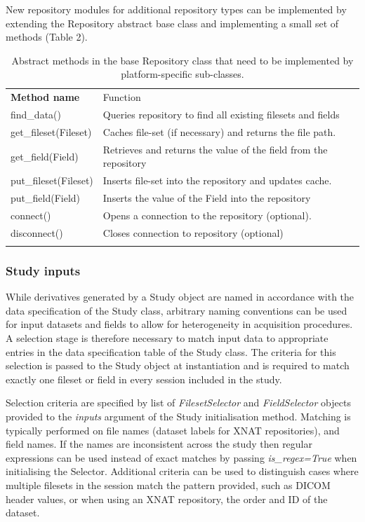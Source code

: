 New repository modules for additional repository types can be
implemented by extending the Repository abstract base class and
implementing a small set of methods (Table 2).

\begin{table}
\caption{Abstract methods in the base Repository class that
need to be implemented by platform-specific sub-classes.}
\label{tbl:abstract-repo-methods} 
\begin{tabular}{ll}
\hline\noalign{\smallskip}
\textbf{Method name} & Function \\
\noalign{\smallskip}\hline\noalign{\smallskip}
find\_data() & Queries repository to find all existing filesets and
fields \\
get\_fileset(Fileset) & Caches file-set (if necessary) and returns the file path. \\
get\_field(Field) & Retrieves and returns the value of the field from
the repository \\
put\_fileset(Fileset) & Inserts file-set into the repository and updates cache. \\
put\_field(Field) & Inserts the value of the Field into the repository \\
connect() & Opens a connection to the repository (optional). \\
disconnect() & Closes connection to repository (optional)\\
\noalign{\smallskip}\hline
\end{tabular}
\end{table}

\subsubsection{Study inputs}
\label{study-inputs}

While derivatives generated by a Study object are named in accordance
with the data specification of the Study class, arbitrary naming
conventions can be used for input datasets and fields to allow for
heterogeneity in acquisition procedures. A selection stage is therefore
necessary to match input data to appropriate entries in the data
specification table of the Study class. The criteria for this selection
is passed to the Study object at instantiation and is required to match
exactly one fileset or field in every session included in the study.

Selection criteria are specified by list of \emph{FilesetSelector} and
\emph{FieldSelector} objects provided to the \emph{inputs} argument of
the Study initialisation method. Matching is typically performed on file
names (dataset labels for XNAT repositories), and field names. If the
names are inconsistent across the study then regular expressions can be
used instead of exact matches by passing \emph{is\_regex=True} when
initialising the Selector. Additional criteria can be used to
distinguish cases where multiple filesets in the session match the
pattern provided, such as DICOM header values, or when using an XNAT
repository, the order and ID of the dataset.

